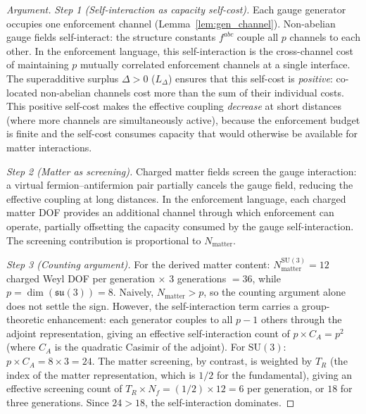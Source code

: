 \documentclass[11pt,a4paper]{article}
\theoremstyle{definition}
\newcommand{\SU}{\mathrm{SU}}
\begin{document}
\begin{proof}[Argument]
\textit{Step 1 (Self-interaction as capacity self-cost).}\quad
Each gauge generator occupies one enforcement channel
(Lemma~\ref{lem:gen_channel}).  Non-abelian gauge fields
self-interact: the structure constants $f^{abc}$ couple all $p$
channels to each other.  In the enforcement language, this
self-interaction is the cross-channel cost of maintaining $p$
mutually correlated enforcement channels at a single interface.  The
superadditive surplus $\Delta > 0$ ($L_\Delta$) ensures that this
self-cost is \emph{positive}: co-located non-abelian channels cost
more than the sum of their individual costs.  This positive
self-cost makes the effective coupling \emph{decrease} at short
distances (where more channels are simultaneously active), because
the enforcement budget is finite and the self-cost consumes capacity
that would otherwise be available for matter interactions.

\textit{Step 2 (Matter as screening).}\quad
Charged matter fields screen the gauge interaction: a virtual
fermion--antifermion pair partially cancels the gauge field,
reducing the effective coupling at long distances.  In the
enforcement language, each charged matter DOF provides an
additional channel through which enforcement can operate, partially
offsetting the capacity consumed by the gauge self-interaction.  The
screening contribution is proportional to $N_{\mathrm{matter}}$.

\textit{Step 3 (Counting argument).}\quad
For the derived matter content:
$N_{\mathrm{matter}}^{\SU(3)} = 12$ charged Weyl DOF per generation
$\times$ 3 generations $= 36$, while $p = \dim(\mathfrak{su}(3)) = 8$.
Naively, $N_{\mathrm{matter}} > p$, so the counting argument alone
does not settle the sign.  However, the self-interaction term carries
a group-theoretic enhancement: each generator couples to all $p - 1$
others through the adjoint representation, giving an effective
self-interaction count of $p \times C_A = p^2$ (where $C_A$ is the
quadratic Casimir of the adjoint).  For $\SU(3)$:
$p \times C_A = 8 \times 3 = 24$.  The matter screening, by contrast,
is weighted by $T_R$ (the index of the matter representation, which is
$1/2$ for the fundamental), giving an effective screening count of
$T_R \times N_f = (1/2) \times 12 = 6$ per generation, or $18$ for
three generations.  Since $24 > 18$, the self-interaction dominates.
\end{proof}
\end{document}
